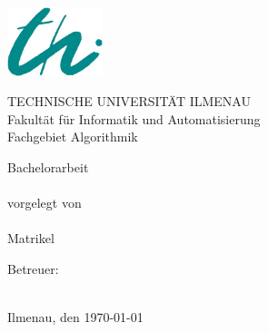 \begin{titlepage}

\begin{center}
\includegraphics[height=2cm]{pics/logo-thi.jpg}
\vspace{1cm}

TECHNISCHE UNIVERSITÄT ILMENAU\\
Fakultät für Informatik und Automatisierung\\
Fachgebiet Algorithmik

\vspace{4cm}

{\large Bachelorarbeit} \\ 
\vspace{1cm}
{\LARGE \normalfont \bfseries \sathema} \\
\vspace{1cm}
{vorgelegt von} \\
\vspace{0.5cm}
{\large \saauthor}\\
{\large Matrikel \matrikel}
\vspace{2cm}

Betreuer: \\
\vspace{0.5cm}
\saprof \\

\vspace{1cm}

Ilmenau, den \today
\end{center}

\end{titlepage}
